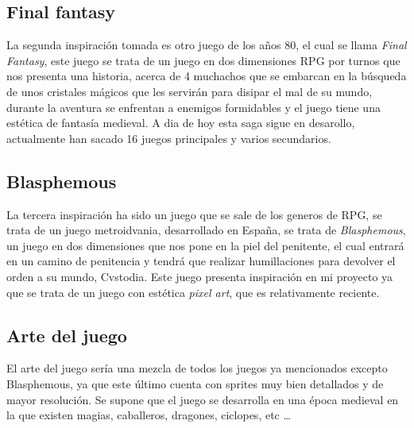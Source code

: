 \documentclass[a4paper]{article}
\begin{document}
\begin{appendices}
    \subsection{Final fantasy}
    La segunda inspiración tomada es otro juego de los años 80, el cual se llama \textit{Final Fantasy}, este juego se trata de un juego en dos dimensiones RPG por turnos que nos presenta una historia,
    acerca de 4 muchachos que se embarcan en la búsqueda de unos cristales mágicos que les servirán para disipar el mal de su mundo, durante la aventura se enfrentan a enemigos formidables y el juego tiene
    una estética de fantasía medieval. A dia de hoy esta saga sigue en desarollo, actualmente han sacado 16 juegos principales y varios secundarios.

    \subsection{Blasphemous}
    La tercera inspiración ha sido un juego que se sale de los generos de RPG, se trata de un juego metroidvania, desarrollado en España, se trata de \textit{Blasphemous},
    un juego en dos dimensiones que nos pone en la piel del penitente, el cual entrará en un camino de penitencia y tendrá que realizar humillaciones para devolver el orden a su mundo, Cvstodia.
    Este juego presenta inspiración en mi proyecto ya que se trata de un juego con estética \textit{pixel art}, que es relativamente reciente.

    \subsection{Arte del juego}
    El arte del juego sería una mezcla de todos los juegos ya mencionados excepto Blasphemous, ya que este último cuenta con sprites muy bien detallados y de mayor resolución.
    Se supone que el juego se desarrolla en una época medieval en la que existen magias, caballeros, dragones, ciclopes, etc \dots

    \clearpage


\end{appendices}
\end{document}
